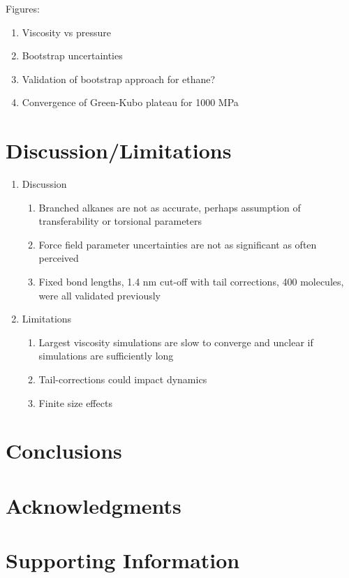 \documentclass[11pt,a4paper]{article}
\begin{document}
Figures:

\begin{enumerate}
	\item Viscosity vs pressure
	\item Bootstrap uncertainties
	\item Validation of bootstrap approach for ethane?
	\item Convergence of Green-Kubo plateau for 1000 MPa
\end{enumerate}

\section{Discussion/Limitations}

\begin{enumerate}
	\item Discussion
	\begin{enumerate}
		\item Branched alkanes are not as accurate, perhaps assumption of transferability or torsional parameters
		\item Force field parameter uncertainties are not as significant as often perceived
		\item Fixed bond lengths, 1.4 nm cut-off with tail corrections, 400 molecules, were all validated previously
	\end{enumerate}
    \item Limitations
    \begin{enumerate}
    	\item Largest viscosity simulations are slow to converge and unclear if simulations are sufficiently long
    	\item Tail-corrections could impact dynamics
    	\item Finite size effects
    \end{enumerate}
\end{enumerate}

\section{Conclusions}

\section{Acknowledgments}

\section{Supporting Information}
\end{document}
